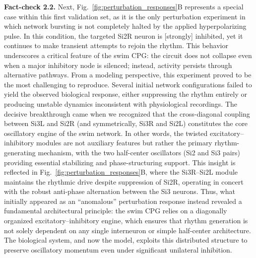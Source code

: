 \documentclass[nofootinbib,aip,amsmath,amssymb,reprint,twocolumn,10pt]{revtex4-2}
\begin{document}
{\bf Fact-check 2.2.} Next, Fig.~\ref{fig:perturbation_responses}B represents a special case within this first validation set, as it is the only perturbation experiment in which network bursting is not completely halted by the applied hyperpolarizing pulse. In this condition, the targeted Si2R neuron is [strongly] inhibited, yet it continues to make transient attempts to rejoin the rhythm. This behavior underscores a critical feature of the swim CPG: the circuit does not collapse even when a major inhibitory node is silenced; instead, activity persists through alternative pathways. From a modeling perspective, this experiment proved to be the most challenging to reproduce. Several initial network configurations failed to yield the observed biological response, either suppressing the rhythm entirely or producing unstable dynamics inconsistent with physiological recordings. The decisive breakthrough came when we recognized that the cross-diagonal coupling between Si3L and Si2R (and symmetrically, Si3R and Si2L) constitutes the core oscillatory engine of the swim network. In other words, the twisted excitatory--inhibitory modules are not auxiliary features but rather the primary rhythm-generating mechanism, with the two half-center oscillators (Si2 and Si3 pairs) providing essential stabilizing and phase-structuring support. This insight is reflected in Fig.~\ref{fig:perturbation_responses}B, where the Si3R--Si2L module maintains the rhythmic drive despite suppression of Si2R, operating in concert with the robust anti-phase alternation between the Si3 neurons. Thus, what initially appeared as an ``anomalous'' perturbation response instead revealed a fundamental architectural principle: the swim CPG relies on a diagonally organized excitatory--inhibitory engine, which ensures that rhythm generation is not solely dependent on any single interneuron or simple half-center architecture. The biological system, and now the model, exploits this distributed structure to preserve oscillatory momentum even under significant unilateral inhibition.    
\end{document}

